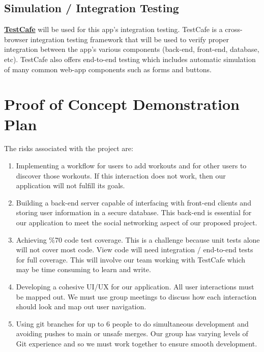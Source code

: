 \documentclass{article}
\begin{document}
	\subsection {Simulation / Integration Testing}
	\textbf{\href{https://testcafe.io/}{TestCafe}} will be used for this app's integration testing. TestCafe is a cross-browser integration testing framework that will be used to verify proper integration between the app's various components (back-end, front-end, database, etc). TestCafe also offers end-to-end testing which includes automatic simulation of many common web-app components such as forms and buttons.
	
	\section {Proof of Concept Demonstration Plan}
	The risks associated with the project are:
	\begin{enumerate}
		\item Implementing a workflow for users to add workouts and for other users to discover those workouts. If this interaction does not work, then our application will not fulfill its goals.
		\item Building a back-end server capable of interfacing with front-end clients and storing user information in a secure database. This back-end is essential for our application to meet the social networking aspect of our proposed project. 
		\item Achieving \%70 code test coverage. This is a challenge because unit tests alone will not cover most code. View code will need integration / end-to-end tests for full coverage. This will involve our team working with TestCafe which may be time consuming to learn and write.
		\item Developing a cohesive UI/UX for our application. All user interactions must be mapped out. We must use group meetings to discuss how each interaction should look and map out user navigation.
		\item Using git branches for up to 6 people to do simultaneous development and avoiding pushes to main or unsafe merges. Our group has varying levels of Git experience and so we must work together to ensure smooth development.
	\end{enumerate}
	
\end{document}
